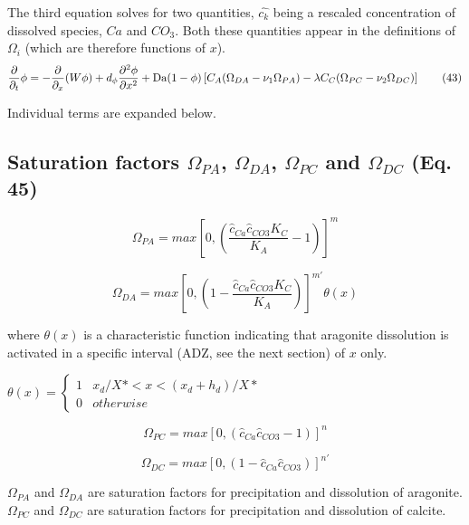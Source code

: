 \documentclass[10pt, letterpaper]{article}
\begin{document}
The third equation solves for two quantities, $\hat{c_k}$ being a rescaled concentration of dissolved species, $Ca$ and $CO_3$. Both these quantities appear in the definitions of $\Omega_i$ (which are therefore functions of $x$).
\begin{equation}
\frac{\partial}{\partial_t} \phi = - \frac{\partial}{\partial_x}(W\phi) + d_{\phi} \frac{\partial^2\phi}{\partial x^2} + \operatorname{Da}(1 - \phi) \left[C_A(\Omega_{DA} - \nu_1\Omega_{PA}) - \\\lambda C_C(\Omega_{PC} - \nu_2\Omega_{DC})\right] \tag{43}
\end{equation}

Individual terms are expanded below.

\subsection{Saturation factors $\Omega_{PA}$, $\Omega_{DA}$, $\Omega_{PC}$ and $\Omega_{DC}$ (Eq. 45)} 

\begin{equation}
\Omega_{PA} = max\left[0, \left(\frac{\hat{c}_{Ca} \hat{c}_{CO3} K_C}{K_A} - 1 \right)\right]^m \nonumber
\end{equation}

\begin{equation}
\Omega_{DA} = max\left[0, \left(1 - \frac{\hat{c}_{Ca} \hat{c}_{CO3} K_C}{K_A} \right)\right] ^{m'} \theta(x) \nonumber 
\end{equation}

where $\theta(x)$ is a characteristic function indicating that aragonite dissolution is activated in a specific interval (ADZ, see the next section) of $x$ only. 

$\theta(x) = \begin{cases}
    1  & x_d/X* < x < (x_d + h_d)/X* \\
    0 & otherwise
\end{cases}$

\begin{equation}
\Omega_{PC} = max\left[0, (\hat{c}_{Ca} \hat{c}_{CO3}  - 1 )\right] ^n \nonumber 
\end{equation}

\begin{equation}
\Omega_{DC} = max\left[0, (1 - \hat{c}_{Ca} \hat{c}_{CO3})\right]^{n'} \nonumber
\end{equation}

$\Omega_{PA}$ and $\Omega_{DA}$ are saturation factors for precipitation and dissolution of aragonite. $\Omega_{PC}$ and $\Omega_{DC}$ are saturation factors for precipitation and dissolution of calcite.
\end{document}
